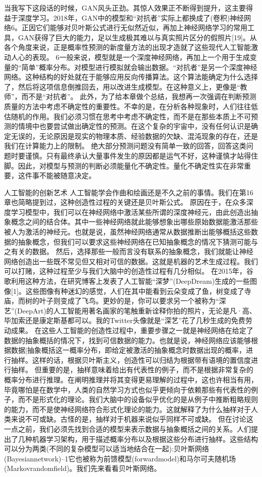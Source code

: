 当我写下这段话的时候，GAN风头正劲。其惊人效果正不断得到提升，这主要得益于深度学习。2018年，GAN中的模型和“对抗者”实际上都换成了(卷积)神经网络6。正因它们能够对贝叶斯公式进行无似然近似，再加上神经网络学习的常用工具，GAN获得了巨大的能力，足以生成极其难以与真实照片区分的假照片[19]。从各个角度来说，正是概率性预测的新度量方法的出现才造就了这些现代人工智能激动人心的表现。
6一般来说，模型就是一个深度神经网络，再加上一个用于生成变量的“简单”概率分布。对模型进行模拟就会输出数据。“对抗者”是另一个深度神经网络。这种结构的好处就在于能够应用反向传播算法。这个算法能确定为什么选择了，然后将这项信息倒推回去，用以改进生成模型。在这种意义上，更像是“教师”，而不是“对抗者”。
此外，为了给本章做个总结，我想再一次强调在判断预测质量的方法中考虑不确定性的重要性。不幸的是，在分析各种现象时，人们往往低估随机的作用。我们必须习惯在思考中考虑不确定性，而不是在那些本质上不可预测的情境中也要尝试做出确定性的预测。在这个复杂的宇宙中，没有任何认识是确定无误的，无论原因是现实的物理本质、经验数据的欠缺、混沌现象的存在，还是我们在计算能力上的限制。
绝大部分预测问题没有简单一致的回答，回答这类问题时要谨慎。只有最终承认大量事件发生的原因都是运气不好，这种谨慎才站得住脚。因此，对模型与预测的判断必须能量化不确定性。量化不确定性实在非常重要，这件事不能被随意决定。


人工智能的创新艺术
人工智能学会作曲和绘画还是不久之前的事情。我们在第16章也简略提到过，这种创造性过程的关键还是贝叶斯公式。
原因在于，在众多深度学习模型中，我们可以在神经网络中激活某些所谓的深度神经元，由此创造出抽象概念之间的结合体。其中一些神经网络就此能够想象出哪些原始数据能激活那些被人为激活的神经元。也就是说，虽然神经网络通常从数据推断出能够概括这些数据的抽象概念，但我们可以要求这些神经网络在已知抽象概念的情况下猜测可能与之有关的数据。
然后，选择那些一般而言没有联系的抽象概念，我们就能让神经网络创造出一些既不常见但又相对可信的数据。这就是机器的艺术生成过程。我们可以打赌，这种过程至少与我们大脑中的创造性过程有几分相似。
在2015年，谷歌利用这种方法，在研究博客上发表了人工智能“深梦”(DeepDream)生成的一些图像[1]。这些图像有种迷幻的感觉，人们在其中能看到云朵变成了鱼，树变成了寺庙，而树的叶子则变成了飞鸟。更妙的是，你可以要求另一个被称为“深艺”(DeepArt)的人工智能用著名画家的笔触重新诠释你拍的照片，无论是凡·高、毕加索还是康定斯基都可以。我的Twitter头像就是“深艺”花了几秒生成的免费劳动成果。
在这些人工智能的创造性过程中，重要步骤之一就是神经网络在给定了数据的抽象概括的情况下，找到可信数据的能力。也就是说，神经网络应该能够根据数据|抽象概括这一概率分布，即给定被激活的抽象概念时数据出现的概率，进行抽样。这样的话，根据贝叶斯主义，创造性可以归结为根据带有语境的置信度进行抽样。
但重要的是，抽样意味着给出有代表性的例子，而不是根据非常复杂的概率分布进行推理。在阐明推理并将其变得更易理解的过程中，这也许相当有用，毕竟哪怕是在数学中，人类的自然学习方式也似乎更倾向于依赖那些有代表性的例子，而不是形式化的理论。我们大脑中的设备似乎优化的是从例子中推断粗略规则的能力，而不是使神经网络符合形式化理论的能力。这就解释了为什么抽样对于人类来说不可或缺。古怪的是，抽样对于机器来说似乎同样不可或缺。
但在讨论这一点之前，我们必须先找到合适的模型来表示数据与抽象概括之间的关系。人们提出了几种机器学习架构，用于描述概率分布以及根据这些分布进行抽样。这些结构可以分为两类(不同的复杂模型可以适当地结合在一起):贝叶斯网络(Bayesiannetwork)--1它也被称为前馈模型(forwardmodel)和马尔可夫随机场(Markovrandomfield)。我们先来看看贝叶斯网络。



